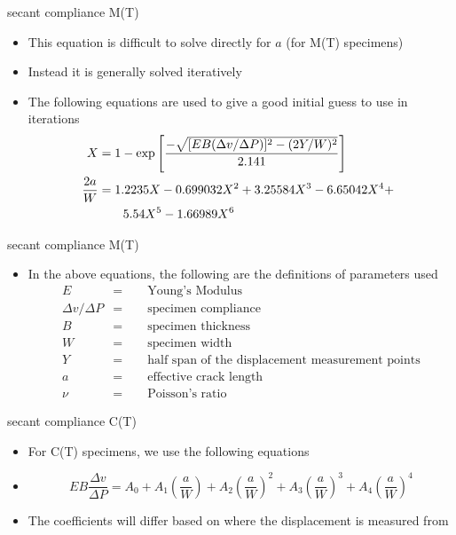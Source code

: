\documentclass[10pt]{beamer}
\begin{document}
\begin{frame}{secant compliance M(T)}
	\begin{itemize}[<+->]
		\item This equation is difficult to solve directly for $a$ (for M(T) specimens) 
		\item Instead it is generally solved iteratively
		\item The following equations are used to give a good initial guess to use in iterations
		\begin{align}
		X &= 1 - \exp \left[\frac{-\sqrt{[EB(\Delta v/ \Delta P)]^2 - (2Y/W)^2}}{2.141}\right]\\
		&\begin{aligned}
		\mathllap{\frac{2a}{W}} &= 1.2235X - 0.699032X^2 + 3.25584X^3 - 6.65042X^4 + \\
		&\qquad5.54X^5 - 1.66989X^6
		\end{aligned}
		\end{align}
	\end{itemize}
\end{frame}

\begin{frame}{secant compliance M(T)}
	\begin{itemize}
		\item In the above equations, the following are the definitions of parameters used
		\begin{align*}
		E &= \qquad \text{Young's Modulus}\\
		\Delta v / \Delta P &= \qquad \text{specimen compliance}\\
		B &= \qquad \text{specimen thickness}\\
		W &= \qquad \text{specimen width}\\
		Y &= \qquad \text{half span of the displacement measurement points}\\
		a &= \qquad \text{effective crack length}\\
		\nu &= \qquad \text{Poisson's ratio}
		\end{align*}
	\end{itemize}
\end{frame}

\begin{frame}{secant compliance C(T)}
	\begin{itemize}[<+->]
		\item For C(T) specimens, we use the following equations
		\item[]
		\begin{equation}
		EB\frac{\Delta v}{\Delta P} = A_0 + A_1\left(\frac{a}{W}\right) + A_2\left(\frac{a}{W}\right)^2 + A_3\left(\frac{a}{W}\right)^3 + A_4\left(\frac{a}{W}\right)^4
		\end{equation}
		\item The coefficients will differ based on where the displacement is measured from
	\end{itemize}
\end{frame}
\end{document}
